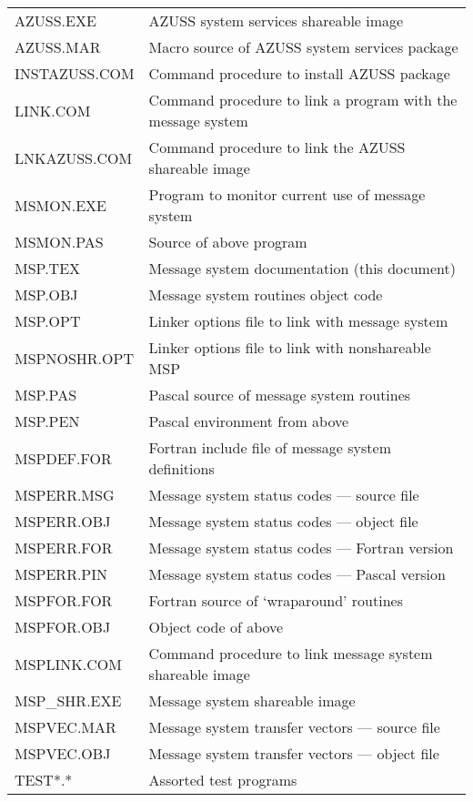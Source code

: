 \begin{tabular}{|l|l|}    \hline
AZUSS.EXE      &   AZUSS system services shareable image    \\
AZUSS.MAR      &   Macro source of AZUSS system services package   \\
INSTAZUSS.COM   &  Command procedure to install AZUSS package  \\
LINK.COM        &  Command procedure to link a program with the message system\\
LNKAZUSS.COM    &  Command procedure to link the AZUSS shareable image \\
MSMON.EXE       &  Program to monitor current use of message system \\
MSMON.PAS      &   Source of above program  \\
MSP.TEX        &   Message system documentation (this document) \\
MSP.OBJ        &   Message system routines object code \\
MSP.OPT       &    Linker options file to link with message system  \\
MSPNOSHR.OPT  &    Linker options file to link with nonshareable MSP \\
MSP.PAS       &    Pascal source of message system routines  \\
MSP.PEN       &    Pascal environment from above \\
MSPDEF.FOR    &    Fortran include file of message system definitions  \\
MSPERR.MSG    &    Message system status codes --- source file \\
MSPERR.OBJ    &    Message system status codes --- object file \\
MSPERR.FOR    &    Message system status codes --- Fortran version \\
MSPERR.PIN    &    Message system status codes --- Pascal version \\
MSPFOR.FOR    &    Fortran source of `wraparound' routines \\
MSPFOR.OBJ    &    Object code of above  \\
MSPLINK.COM   &    Command procedure to link message system shareable image \\
MSP\_SHR.EXE    &    Message system shareable image \\
MSPVEC.MAR    &    Message system transfer vectors --- source file \\
MSPVEC.OBJ    &    Message system transfer vectors --- object file \\
TEST*.*       &    Assorted test programs   \\    \hline
\end{tabular}


